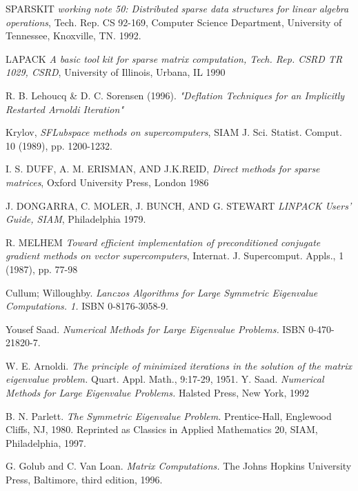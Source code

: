 \documentclass[a4paper,openright,12pt, oneside]{book}
\begin{document}
\begin{thebibliography}{X}

  SPARSKIT 
  \emph{working note 50: Distributed sparse data structures for linear algebra operations},
  Tech. Rep. CS 92-169, Computer Science Department, University of Tennessee, Knoxville, TN.
  1992.

  LAPACK 
  \emph{A basic tool kit for sparse matrix computation, Tech. Rep. CSRD TR 1029, CSRD},
  University of Illinois, Urbana, IL
  1990

    R. B. Lehoucq \& D. C. Sorensen (1996). 
    \emph{"Deflation Techniques for an Implicitly Restarted Arnoldi Iteration"}

  Krylov,
  \emph{SFLubspace methods on supercomputers},
  SIAM J. Sci. Statist. Comput.
  10 (1989), pp. 1200-1232.

  I. S. DUFF, A. M. ERISMAN, AND J.K.REID,
  \emph{Direct methods for sparse matrices},
  Oxford University Press, London
  1986

  J. DONGARRA, C. MOLER, J. BUNCH, AND G. STEWART
  \emph{LINPACK Users' Guide, SIAM},
  Philadelphia
  1979.

  R. MELHEM
  \emph{Toward efficient implementation of preconditioned conjugate gradient methods on vector supercomputers},
  Internat. J. Supercomput. Appls., 1 (1987), pp. 77-98

  Cullum; Willoughby. 
  \emph{Lanczos Algorithms for Large Symmetric Eigenvalue Computations. 1.} 
  ISBN 0-8176-3058-9.

  Yousef Saad. 
  \emph{Numerical Methods for Large Eigenvalue Problems.} 
  ISBN 0-470-21820-7.

    W. E. Arnoldi. 
    \emph{The principle of minimized iterations in the solution of the matrix eigenvalue problem.} 
    Quart. Appl. Math., 9:17-29, 1951.
    Y. Saad. 
    \emph{Numerical Methods for Large Eigenvalue Problems.}
    Halsted Press, New York, 1992

    B. N. Parlett. 
    \emph{The Symmetric Eigenvalue Problem.}
    Prentice-Hall, Englewood Cliffs, NJ, 1980. 
    Reprinted as Classics in Applied Mathematics 20, SIAM, Philadelphia, 1997.

    G. Golub and C. Van Loan. 
    \emph{Matrix Computations.}
    The Johns Hopkins University Press, Baltimore, third edition, 1996.


\end{thebibliography}
\end{document}
